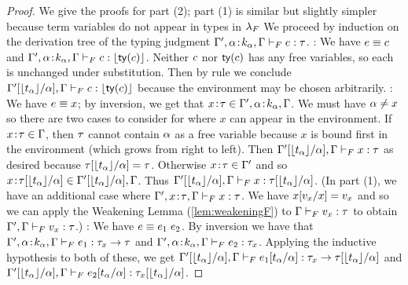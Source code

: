 \begin{proof}
  We give the proofs for part (2); part (1) is similar but slightly
  simpler because term variables do not appear in types in $\sysf$
  We proceed by induction on the derivation tree of the typing judgment
  $\hasftype{\tcenv', \bind{\al}{k_{\al}}, \tcenv}{\sexpr}{\sftype}$.
  \pfcase{\fPrim}: We have $\sexpr \equiv \sconst$ and
  $\hasftype{\tcenv', \bind{\al}{k_{\al}}, \tcenv}{\sconst}{\forgetreft{\ty{\sconst}}}$.
  Neither $\sconst$ nor $\ty{\sconst}$ has any free variables, so each is 
  unchanged under substitution. Then by rule \tPrim we conclude
  $\hasftype{\subst{\tcenv'}{\al}{\forgetreft{\stype_{\al}}}, \tcenv}{\sconst}{\forgetreft{\ty{\sconst}}}$ because the environment may be chosen arbitrarily.
  \pfcase{\fVar}: We have $\sexpr \equiv x$; by inversion, we get that 
  $\bind{x}{\sftype} \in \tcenv', \bind{\al}{k_{\al}}, \tcenv$. We must have
  $\tvar \neq x$ so there are two cases to consider for where $x$ can 
  appear in the environment. If $\bind{x}{\sftype} \in \tcenv$,  then $\sftype$
  cannot contain $\tvar$ as a free variable because $x$ is bound first in the environment (which grows from right to left). Then
  $\hasftype{\subst{\tcenv'}{\al}{\forgetreft{\stype_{\al}}}, \tcenv}{x}{\sftype}$
  as desired because $\subst{\sftype}{\tvar}{\forgetreft{\stype_{\al}}} = \sftype$.
  Otherwise $\bind{x}{\sftype} \in \tcenv'$ and so 
  $\bind{x}{\subst{\sftype}{\tvar}{\forgetreft{\stype_{\al}}}} \in \subst{\tcenv'}{\al}{\forgetreft{\stype_{\al}}}, \tcenv$. Thus
  $\hasftype{\subst{\tcenv'}{\al}{\forgetreft{\stype_{\al}}}, \tcenv}{x}{\subst{\sftype}{\tvar}{\forgetreft{\stype_{\al}}}}$.
  (In part (1), we have an additional case where 
  $\hasftype{\tcenv', \bind{x}{\sftype}, \tcenv}{x}{\sftype}$. We have
  $\subst{x}{x}{\sval_x} = \sval_x$ and so we can apply 
  the Weakening Lemma (\ref{lem:weakeningF})
  to $\hasftype{\tcenv}{\sval_x}{\sftype}$ to obtain
  $\hasftype{\tcenv', \tcenv}{\sval_x}{\sftype}$.)
  \pfcase{\fApp}: We have $\sexpr \equiv \app{\sexpr_1}{\sexpr_2}$. By inversion
  we have that
  $\hasftype{\tcenv', \bind{\al}{k_{\al}}, \tcenv}{\sexpr_1}{\funcftype{\sftype_x}{\sftype}}$
  and $\hasftype{\tcenv', \bind{\al}{k_{\al}}, \tcenv}{\sexpr_2}{\sftype_x}$.
  Applying the inductive hypothesis to both of these, we get
  $\hasftype{\subst{\tcenv'}{\al}{\forgetreft{\stype_{\al}}}, \tcenv}{\subst{\sexpr_1}{\tvar}{\stype_{\tvar}}}{\subst{\funcftype{\sftype_x}{\sftype}}{\tvar}{\forgetreft{\stype_{\tvar}}}}$
  and
  $\hasftype{\subst{\tcenv'}{\al}{\forgetreft{\stype_{\al}}}, \tcenv}{\subst{\sexpr_2}{\tvar}{\stype_{\tvar}}}{\subst{\sftype_x}{\tvar}{\forgetreft{\stype_{\tvar}}}}$. 

\end{proof}
